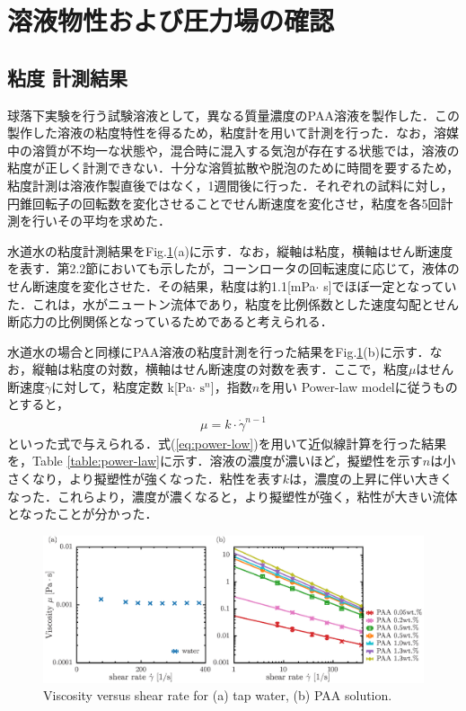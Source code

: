 \section{溶液物性および圧力場の確認}
\subsection{粘度 計測結果}
球落下実験を行う試験溶液として，異なる質量濃度のPAA溶液を製作した．この製作した溶液の粘度特性を得るため，粘度計を用いて計測を行った．なお，溶媒中の溶質が不均一な状態や，混合時に混入する気泡が存在する状態では，溶液の粘度が正しく計測できない．十分な溶質拡散や脱泡のために時間を要するため，粘度計測は溶液作製直後ではなく，1週間後に行った．それぞれの試料に対し，円錐回転子の回転数を変化させることでせん断速度を変化させ，粘度を各5回計測を行いその平均を求めた．

水道水の粘度計測結果をFig.\ref{fig:vis}(a)に示す．なお，縦軸は粘度，横軸はせん断速度を表す．第2.2節においても示したが，コーンロータの回転速度に応じて，液体のせん断速度を変化させた．その結果，粘度は約1.1[mPa$\cdot$ s]でほぼ一定となっていた．これは，水がニュートン流体であり，粘度を比例係数とした速度勾配とせん断応力の比例関係となっているためであると考えられる．

水道水の場合と同様にPAA溶液の粘度計測を行った結果をFig.\ref{fig:vis}(b)に示す．なお，縦軸は粘度の対数，横軸はせん断速度の対数を表す．ここで，粘度$\mu$はせん断速度$\dot{\gamma}$に対して，粘度定数 k[Pa$\cdot$ $\text{s}^n$]，指数$n$を用い Power-law modelに従うものとすると，
\begin{eqnarray}
	\label{eq:power-low}
	\mu=k\cdot\dot{\gamma}^{n-1}
\end{eqnarray}
といった式で与えられる\cite{ref:1}．式(\ref{eq:power-low})を用いて近似線計算を行った結果を，Table \ref{table:power-law}に示す．溶液の濃度が濃いほど，擬塑性を示す$n$は小さくなり，より擬塑性が強くなった．粘性を表す$k$は，濃度の上昇に伴い大きくなった．これらより，濃度が濃くなると，より擬塑性が強く，粘性が大きい流体となったことが分かった．

\begin{figure}[ht]
	\centering
	\includegraphics[width=15cm,clip]{3-Physical_Property/viscosity.eps}
	\caption{Viscosity versus shear rate for (a) tap water, (b) PAA solution.}
	\label{fig:vis}
\end{figure}

